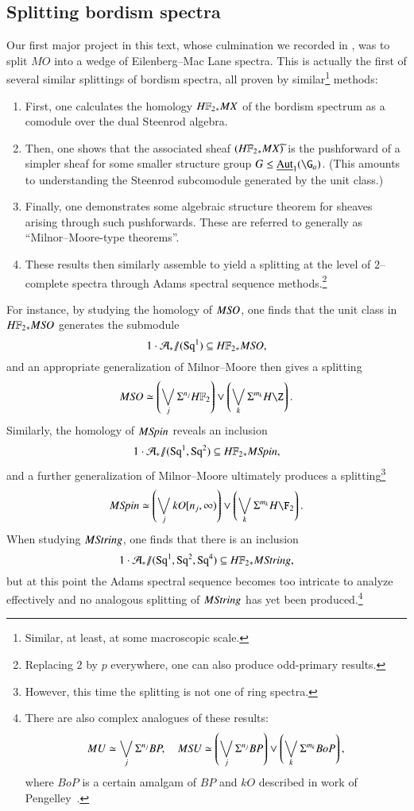 \subsection*{Splitting bordism spectra}

Our first major project in this text, whose culmination we recorded in , was to split $MO$ into a wedge of Eilenberg--Mac Lane spectra.  This is actually the first of several similar splittings of bordism spectra, all proven by similar\footnote{Similar, at least, at some macroscopic scale.} methods:
\begin{enumerate}
    \item First, one calculates the homology $\HFtwo_* MX$ of the bordism spectrum as a comodule over the dual Steenrod algebra.
    \item Then, one shows that the associated sheaf $(\HFtwo_* MX)\widetilde{}$ is the pushforward of a simpler sheaf for some smaller structure group $G \le \InternalAut_1(\G_a)$.  (This amounts to understanding the Steenrod subcomodule generated by the unit class.)
    \item Finally, one demonstrates some algebraic structure theorem for sheaves arising through such pushforwards.  These are referred to generally as ``Milnor--Moore-type theorems''.
    \item These results then similarly assemble to yield a splitting at the level of $2$--complete spectra through Adams spectral sequence methods.\footnote{Replacing $2$ by $p$ everywhere, one can also produce odd-primary results.}
\end{enumerate}

For instance, by studying the homology of $M\mathit{SO}$, one finds that the unit class in $\HFtwo_* M\SO$ generates the submodule \[1 \cdot \mathcal A_* \mmod (\Sq^1) \subseteq \HFtwo_* M\SO,\] and an appropriate generalization of Milnor--Moore then gives a splitting \[M\SO \simeq \left( \bigvee_j \Susp^{n_j} \HFtwo \right) \vee \left( \bigvee_k \Susp^{m_k} H\Z \right).\]  Similarly, the homology of $M\mathit{Spin}$ reveals an inclusion~\cite{ABP,GiambalvoPengelley} \[1 \cdot \mathcal A_* \mmod (\Sq^1, \Sq^2) \subseteq \HFtwo_* M\Spin,\] and a further generalization of Milnor--Moore ultimately produces a splitting\footnote{However, this time the splitting is not one of ring spectra.} \[M\Spin \simeq \left( \bigvee_j kO[n_j, \infty)\right) \vee \left( \bigvee_k \Susp^{m_k} H\F_2 \right).\]  When studying $M\mathit{String}$, one finds that there is an inclusion \[1 \cdot \mathcal A_* \mmod (\Sq^1, \Sq^2, \Sq^4) \subseteq \HFtwo_* M\String,\] but at this point the Adams spectral sequence becomes too intricate to analyze effectively and no analogous splitting of $M\mathit{String}$ has yet been produced.\footnote{There are also complex analogues of these results:
\[
MU \simeq \bigvee_j \Sigma^{n_j} BP, \quad
M\mathit{SU} \simeq \left(\bigvee_j \Sigma^{n_j} BP\right) \vee \left(\bigvee_k \Sigma^{m_k} BoP \right),
\]
where $BoP$ is a certain amalgam of $BP$ and $kO$ described in work of Pengelley~\cite{Pengelley}.}

